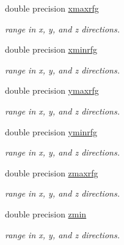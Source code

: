 \textbf{ }\par
\begin{DoxyCompactItemize}
\item 
double precision \mbox{\hyperlink{namespacedataclass_a32b5b26da65d1b3507a36c17029a18ae}{xmaxrfg}}
\begin{DoxyCompactList}\small\item\em range in x, y, and z directions. \end{DoxyCompactList}\item 
double precision \mbox{\hyperlink{namespacedataclass_ab5b5b652fce1e93de12accd3514958a0}{xminrfg}}
\begin{DoxyCompactList}\small\item\em range in x, y, and z directions. \end{DoxyCompactList}\item 
double precision \mbox{\hyperlink{namespacedataclass_a79212aa125148748cc4bd5a11fff492f}{ymaxrfg}}
\begin{DoxyCompactList}\small\item\em range in x, y, and z directions. \end{DoxyCompactList}\item 
double precision \mbox{\hyperlink{namespacedataclass_a5393ad3032e6f0311c62d03d468a6cf0}{yminrfg}}
\begin{DoxyCompactList}\small\item\em range in x, y, and z directions. \end{DoxyCompactList}\item 
double precision \mbox{\hyperlink{namespacedataclass_a52b6a1ee39c205fce4ef2be72ab153aa}{zmaxrfg}}
\begin{DoxyCompactList}\small\item\em range in x, y, and z directions. \end{DoxyCompactList}\item 
double precision \mbox{\hyperlink{namespacedataclass_a9c2398fd87701d5c0de37ff6b3357a0c}{zmin}}
\begin{DoxyCompactList}\small\item\em range in x, y, and z directions. \end{DoxyCompactList}\end{DoxyCompactItemize}

